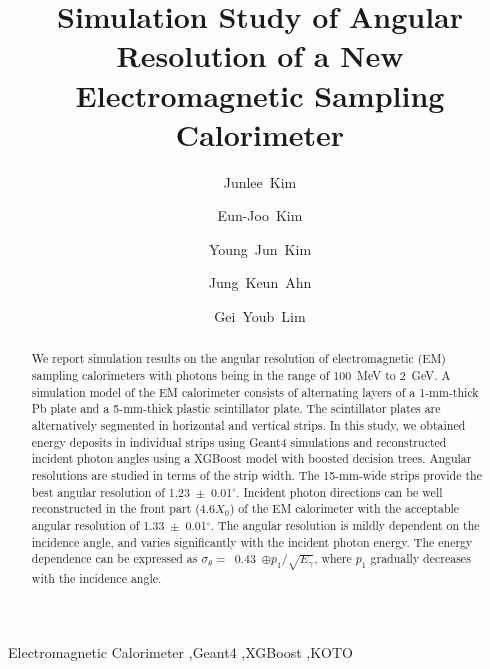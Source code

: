 \documentclass[preprint,12pt,times,a4paper]{elsarticle}
\begin{document}
\begin{frontmatter}

\setcounter{page}{0}
\title{Simulation Study of Angular Resolution of a New Electromagnetic Sampling Calorimeter}

\author[jbnu]{Junlee~Kim}

\author[jbnu]{Eun-Joo~Kim}

\author[korea]{Young~Jun~Kim}
\author[korea]{Jung~Keun~Ahn}
\author[kek]{Gei~Youb~Lim}

\address[jbnu]{Division of Science Education, Jeonbuk National University, Jeonju 54896, Korea}
\address[korea]{Department of Physics, Korea University, Seoul 02841, Korea}
\address[kek]{Institute of Particle and Nuclear Studies (IPNS), High Energy Accelerator Research Organization (KEK), Tsukuba 305-0801, Japan}


\begin{abstract}
We report simulation results on the angular resolution of electromagnetic (EM) sampling calorimeters with photons being in the range of 100~MeV to 2~GeV. A simulation model of the EM calorimeter consists of alternating layers of a 1-mm-thick Pb plate and a 5-mm-thick plastic scintillator plate. The scintillator plates are alternatively segmented in horizontal and vertical strips. In this study, we obtained energy deposits in individual strips using Geant4 simulations and reconstructed incident photon angles using a XGBoost model with boosted decision trees. Angular resolutions are studied in terms of the strip width. The 15-mm-wide strips provide the best angular resolution of 1.23~$\pm$~0.01$^{\circ}$. Incident photon directions can be well reconstructed in the front part (4.6$X_{0}$) of the EM calorimeter with the acceptable angular resolution of 1.33~$\pm$~0.01$^{\circ}$. The angular resolution is mildly dependent on the incidence angle, and varies significantly with the incident photon energy. The energy dependence can be expressed as $\sigma_{\theta}=$~0.43~$\oplus p_{1} /\sqrt{E_{\gamma}}$, where $p_{1}$ gradually decreases with the incidence angle.

\end{abstract}
\begin{keyword}
Electromagnetic Calorimeter \sep Geant4 \sep XGBoost \sep KOTO
\end{keyword}

\end{frontmatter}
\end{document}
